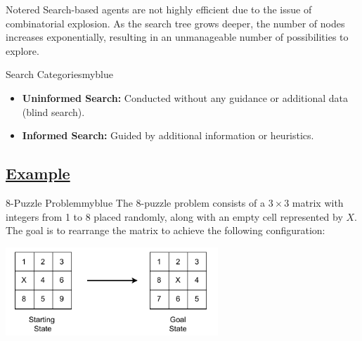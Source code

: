 \vspace{0.35cm}

\begin{prettyBox}{Note}{red}
Search-based agents are not highly efficient due to the issue of combinatorial explosion. As the search tree grows deeper, the number of nodes increases exponentially, resulting in an unmanageable number of possibilities to explore.
\end{prettyBox}

\vspace{0.35cm}

\begin{prettyBox}{Search Categories}{myblue}
\begin{itemize}
    \item \textbf{Uninformed Search:} Conducted without any guidance or additional data (blind search).
    \item \textbf{Informed Search:} Guided by additional information or heuristics.
\end{itemize}
\end{prettyBox}

\newpage
\subsection*{\underline{Example}}

\vspace{0.5cm}
\begin{prettyBox}{8-Puzzle Problem}{myblue}
The 8-puzzle problem consists of a \(3 \times 3\) matrix with integers from 1 to 8 placed randomly, along with an empty cell represented by \(X\). The goal is to rearrange the matrix to achieve the following configuration:
\end{prettyBox}

\vspace{0.65cm}
\begin{center}
    \includegraphics[width=0.6\textwidth]{Chapters/Example/Uninformed/ex1.drawio.pdf}
\end{center}

\vspace{0.45cm}

